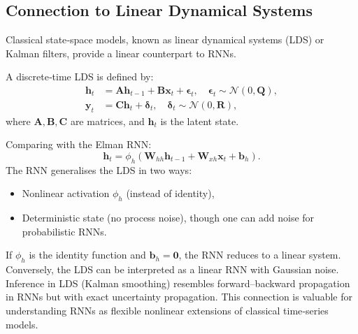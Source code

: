 \documentclass{tufte-handout}
\begin{document}
\subsection{Connection to Linear Dynamical Systems}

Classical state‑space models, known as linear dynamical systems (LDS) or Kalman filters, provide a linear counterpart to RNNs.

\begin{defn}
    A discrete‑time LDS is defined by:
    \begin{align}
        \mathbf{h}_t &= \mathbf{A} \mathbf{h}_{t-1} + \mathbf{B} \mathbf{x}_t + \boldsymbol{\epsilon}_t, \quad \boldsymbol{\epsilon}_t \sim \mathcal{N}(0, \mathbf{Q}), \\
        \mathbf{y}_t &= \mathbf{C} \mathbf{h}_t + \boldsymbol{\delta}_t, \quad \boldsymbol{\delta}_t \sim \mathcal{N}(0, \mathbf{R}),
    \end{align}
    where $\mathbf{A}, \mathbf{B}, \mathbf{C}$ are matrices, and $\mathbf{h}_t$ is the latent state.
\end{defn}

Comparing with the Elman RNN:
\[
\mathbf{h}_t = \phi_h(\mathbf{W}_{hh}\mathbf{h}_{t-1} + \mathbf{W}_{xh}\mathbf{x}_t + \mathbf{b}_h).
\]
The RNN generalises the LDS in two ways:
\begin{itemize}
    \item Nonlinear activation $\phi_h$ (instead of identity),
    \item Deterministic state (no process noise), though one can add noise for probabilistic RNNs.
\end{itemize}

If $\phi_h$ is the identity function and $\mathbf{b}_h = \mathbf{0}$, the RNN reduces to a linear system. Conversely, the LDS can be interpreted as a linear RNN with Gaussian noise. Inference in LDS (Kalman smoothing) resembles forward–backward propagation in RNNs but with exact uncertainty propagation. This connection is valuable for understanding RNNs as flexible nonlinear extensions of classical time‑series models.

\begin{marginfigure}
\centering
{}
\caption{RNNs generalise linear dynamical systems by replacing linear transitions with nonlinear functions.}
\end{marginfigure}
\end{document}
